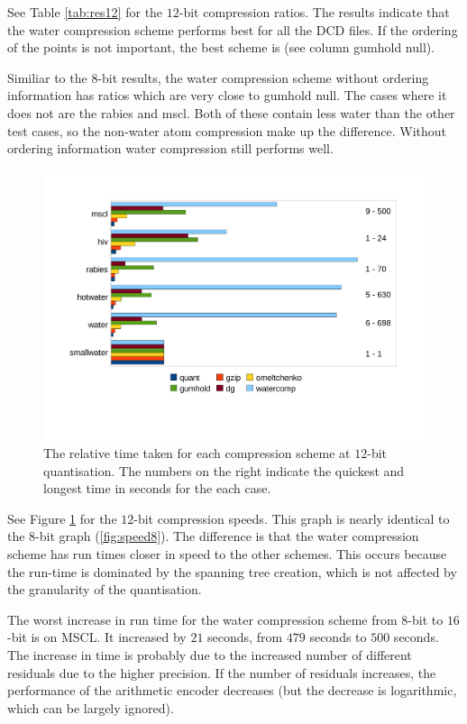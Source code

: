 \documentclass[a4paper]{report}
\begin{document}
See Table \ref{tab:res12} for the $12$-bit compression ratios. The results
indicate that the water compression scheme performs best for all the DCD
files. If the ordering of the points is not important, the best scheme is
\citet{gumholdcomp} (see column gumhold null).

Similiar to the $8$-bit results, the water compression scheme without ordering
information has ratios which are very close to gumhold null. The cases where
it does not are the rabies and mscl. Both of these contain less water than the
other test cases, so the non-water atom compression make up the
difference. Without ordering information water compression still performs
well.

\begin{figure}[h]
\centering
\includegraphics[trim = 10mm 25mm 10mm 20mm, clip, width=\textwidth]{images/speed12}
\caption{The relative time taken for each compression scheme at $12$-bit
  quantisation. The numbers on the right indicate the quickest and longest
  time in seconds for the each case.}
\label{fig:speed12}
\end{figure}

See Figure \ref{fig:speed12} for the $12$-bit compression speeds. This graph
is nearly identical to the $8$-bit graph (\ref{fig:speed8}). The difference is
that the water compression scheme has run times closer in speed to the other
schemes. This occurs because the run-time is dominated by the spanning tree
creation, which is not affected by the granularity of the quantisation.

The worst increase in run time for the water compression scheme from $8$-bit
to $16$-bit is on MSCL. It increased by $21$ seconds, from $479$ seconds to
$500$ seconds. The increase in time is probably due to the increased number of
different residuals due to the higher precision. If the number of residuals
increases, the performance of the arithmetic encoder decreases (but the
decrease is logarithmic, which can be largely ignored).
\end{document}
